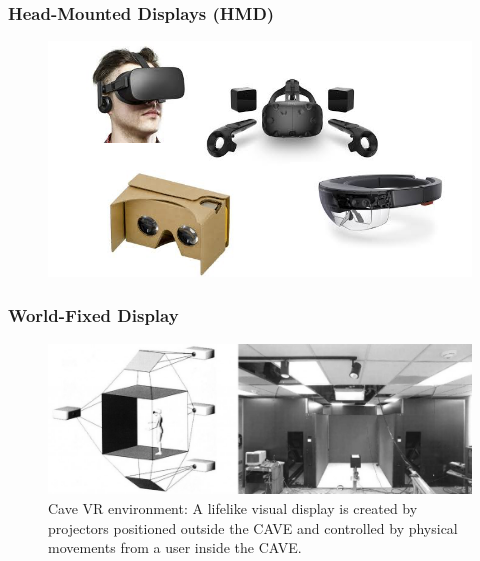 \begin{frame}
	\frametitle{Head-Mounted Displays (HMD)}
	\begin{figure}
		\includegraphics[scale=0.4]{assets/hmd.png}
	\end{figure}
\end{frame}

\begin{frame}
	\frametitle{World-Fixed Display}
	\begin{figure}
		\includegraphics[scale=0.3]{assets/cave.jpg}
		\caption{Cave VR environment: A lifelike visual display is created by projectors positioned outside the CAVE and controlled by physical movements from a user inside the CAVE.}
	\end{figure}
\end{frame}

